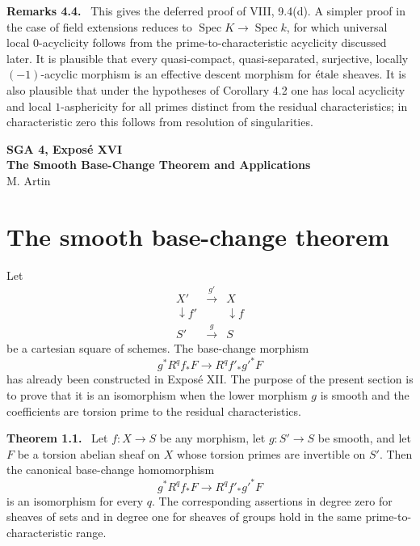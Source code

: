 \documentclass[12pt]{article}
\newcommand{\Spec}{\operatorname{Spec}}
\newcommand{\etale}{\ifmmode\textnormal{\'etale}\else\'etale\fi}
\newenvironment{statement}[1]{\par\medskip\noindent\textbf{#1.}\ }{\par\medskip}
\newenvironment{remarktext}[1]{\par\medskip\noindent\textbf{#1.}\ }{\par\medskip}
\begin{document}
\begin{remarktext}{Remarks 4.4}
This gives the deferred proof of VIII, 9.4(d). A simpler proof in the case of field extensions reduces to \(\Spec K\to\Spec k\), for which universal local \(0\)-acyclicity follows from the prime-to-characteristic acyclicity discussed later. It is plausible that every quasi-compact, quasi-separated, surjective, locally \((-1)\)-acyclic morphism is an effective descent morphism for \(\etale\) sheaves. It is also plausible that under the hypotheses of Corollary 4.2 one has local acyclicity and local \(1\)-asphericity for all primes distinct from the residual characteristics; in characteristic zero this follows from resolution of singularities.
\end{remarktext}



\clearpage
\begin{center}
{\Large \textbf{SGA 4, Expos\'e XVI}}\\[0.35em]
{\large \textbf{The Smooth Base-Change Theorem and Applications}}\\[0.25em]
{\normalsize M. Artin}
\end{center}

\section{The smooth base-change theorem}

Let
\[
\begin{array}{ccc}
X'&\xrightarrow{g'}&X\\
\downarrow f'&&\downarrow f\\
S'&\xrightarrow{g}&S
\end{array}
\]
be a cartesian square of schemes. The base-change morphism
\[
g^*R^qf_*F\longrightarrow R^qf'_*g'^*F
\]
has already been constructed in Expos\'e XII. The purpose of the present section is to prove that it is an isomorphism when the lower morphism \(g\) is smooth and the coefficients are torsion prime to the residual characteristics.

\begin{statement}{Theorem 1.1}
Let \(f:X\to S\) be any morphism, let \(g:S'\to S\) be smooth, and let \(F\) be a torsion abelian sheaf on \(X\) whose torsion primes are invertible on \(S'\). Then the canonical base-change homomorphism
\[
g^*R^qf_*F\longrightarrow R^qf'_*g'^*F
\]
is an isomorphism for every \(q\). The corresponding assertions in degree zero for sheaves of sets and in degree one for sheaves of groups hold in the same prime-to-characteristic range.
\end{statement}
\end{document}

